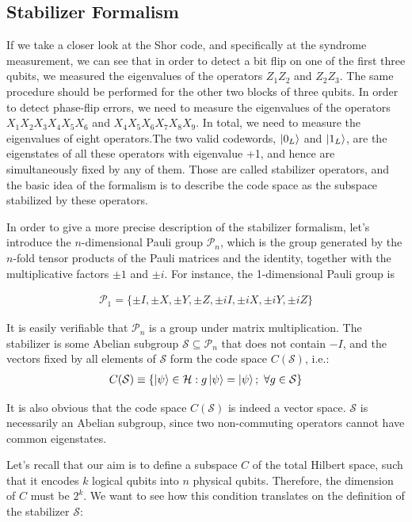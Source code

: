 \documentclass[12pt, twoside, openany]{book}
\begin{document}
\subsection{Stabilizer Formalism}

If we take a closer look at the Shor code, and specifically at the syndrome measurement, we can see that in order to detect a bit flip on one of the first three qubits, we measured the eigenvalues of the operators $Z_1 Z_2$ and $Z_2 Z_3$. The same procedure should be performed for the other two blocks of three qubits. In order to detect phase-flip errors, we need to measure the eigenvalues of the operators $X_1 X_2 X_3 X_4 X_5 X_6$ and $X_4 X_5 X_6 X_7 X_8 X_9$. In total, we need to measure the eigenvalues of eight operators.The two valid codewords, $\ket{0_L}$ and $\ket{1_L}$, are the eigenstates of all these operators with eigenvalue +1, and hence are simultaneously fixed by any of them. Those are called stabilizer operators, and the basic idea of the formalism is to describe the code space as the subspace stabilized by these operators. 

In order to give a more precise description of the stabilizer formalism, let's introduce the $n$-dimensional Pauli group $\mathcal{P}_n$, which is the group generated by the $n$-fold tensor products of the Pauli matrices and the identity, together with the multiplicative factors $\pm 1$ and $\pm i$. For instance, the 1-dimensional Pauli group is 

\begin{align*}
    \mathcal{P}_1 = \{ \pm I, \pm X, \pm Y, \pm Z, \pm iI, \pm iX, \pm iY, \pm iZ  \}
\end{align*}

It is easily verifiable that $\mathcal{P}_n$ is a group under matrix multiplication. The stabilizer is some Abelian subgroup $\mathcal{S} \subseteq \mathcal{P}_n$ that does not contain $-I$, and the vectors fixed by all elements of $\mathcal{S}$ form the code space $C(\mathcal{S})$, i.e.:
\begin{align*}
    C(\mathcal{S}) \equiv \{ \ket{\psi} \in \mathcal{H} : g \ket{\psi} = \ket{\psi}; \ \forall g \in \mathcal{S} \}
\end{align*}

It is also obvious that the code space $C(\mathcal{S})$ is indeed a vector space. $\mathcal{S}$ is necessarily an Abelian subgroup, since two non-commuting operators cannot have common eigenstates. 

Let's recall that our aim is to define a subspace $C$ of the total Hilbert space, such that it encodes $k$ logical qubits into $n$ physical qubits. Therefore, the dimension of $C$ must be $2^k$. We want to see how this condition translates on the definition of the stabilizer $\mathcal{S}$:
\end{document}
